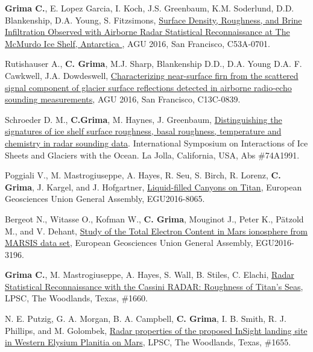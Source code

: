 \begin{etaremune}
\item
  \textbf{Grima C.}, E. Lopez Garcia, I. Koch, J.S. Greenbaum, K.M.
  Soderlund, D.D. Blankenship, D.A. Young, S. Fitzsimons,
  \href{https://agu.confex.com/agu/fm16/meetingapp.cgi/Paper/197146}{
  Surface Density, Roughness, and Brine Infiltration Observed with
  Airborne Radar Statistical Reconnaissance at The McMurdo Ice Shelf,
  Antarctica }, AGU 2016, San Francisco, C53A-0701.
\item
  Rutishauser A., \textbf{C. Grima}, M.J. Sharp, Blankenship D.D., D.A.
  Young D.A. F. Cawkwell, J.A. Dowdeswell,
  \href{https://agu.confex.com/agu/fm16/meetingapp.cgi/Paper/152238}{Characterizing
  near-surface firn from the scattered signal component of glacier
  surface reflections detected in airborne radio-echo sounding
  measurements}, AGU 2016, San Francisco, C13C-0839.
\item
  Schroeder D. M., \textbf{C.Grima}, M. Haynes, J. Greenbaum,
  \href{http://www.igsoc.org/symposia/2016/lajolla/proceedings/procsfiles/procabstracts_69.html\#A1991}{Distinguishing
  the signatures of ice shelf surface roughness, basal roughness,
  temperature and chemistry in radar sounding data}. International
  Symposium on Interactions of Ice Sheets and Glaciers with the Ocean.
  La Jolla, California, USA, Abs \#74A1991.
\item
  Poggiali V., M. Mastrogiuseppe, A. Hayes, R. Seu, S. Birch, R. Lorenz,
  \textbf{C. Grima}, J. Kargel, and J. Hofgartner,
  \href{http://meetingorganizer.copernicus.org/EGU2016/EGU2016-8065.pdf}{Liquid-filled
  Canyons on Titan}, European Geosciences Union General Assembly,
  EGU2016-8065.
\item
  Bergeot N., Witasse O., Kofman W., \textbf{C. Grima}, Mouginot J.,
  Peter K., Pätzold M., and V. Dehant,
  \href{http://meetingorganizer.copernicus.org/EGU2016/EGU2016-3196.pdf}{Study
  of the Total Electron Content in Mars ionosphere from MARSIS data
  set}, European Geosciences Union General Assembly, EGU2016-3196.
\item
  \textbf{Grima C.}, M. Mastrogiuseppe, A. Hayes, S. Wall, B. Stiles, C.
  Elachi,
  \href{http://www.hou.usra.edu/meetings/lpsc2016/pdf/1660.pdf}{Radar
  Statistical Reconnaissance with the Cassini RADAR: Roughness of
  Titan's Seas}, LPSC, The Woodlands, Texas, \#1660.
\item
  N. E. Putzig, G. A. Morgan, B. A. Campbell, \textbf{C. Grima}, I. B.
  Smith, R. J. Phillips, and M. Golombek,
  \href{http://www.hou.usra.edu/meetings/lpsc2016/pdf/1655.pdf}{Radar
  properties of the proposed InSight landing site in Western Elysium
  Planitia on Mars}, LPSC, The Woodlands, Texas, \#1655.


\end{etaremune}

